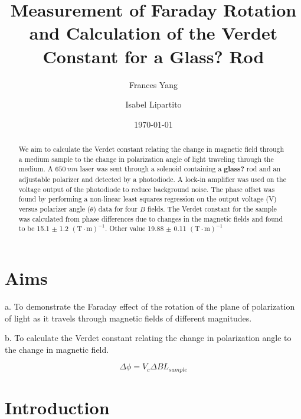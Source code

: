 \documentclass[prb,preprint]{revtex4-1}
\begin{document}
\title{Measurement of Faraday Rotation and Calculation of the Verdet Constant for a Glass? Rod}

\author{Frances Yang}

\author{Isabel Lipartito}

\date{\today}

\begin{abstract}
{We aim to calculate the Verdet constant relating the change in magnetic field through a medium sample to the change in polarization angle of light traveling through the medium.  A $650\ nm$ laser was sent through a solenoid containing a {\bf glass?} rod and an adjustable polarizer and detected by a photodiode. A lock-in amplifier was used on the voltage output of the photodiode to reduce background noise. The phase offset was found by performing a non-linear least squares regression on the output voltage (V) versus polarizer angle ($\theta$) data for four $B$ fields. The Verdet constant for the sample was calculated from phase differences due to changes in the magnetic fields and found to be 15.1 $\pm$ 1.2 $(\text{T}\cdot \text{m})^{-1}$. Other value  19.88 $\pm$ 0.11 $(\text{T}\cdot \text{m})^{-1}$}
\end{abstract}

\maketitle 
\section{Aims}
{a.  To demonstrate the Faraday effect of the rotation of the plane of polarization of light as it travels through magnetic fields of different magnitudes.

b.  To calculate the Verdet constant relating the change in polarization angle to the change in magnetic field.}
\begin{equation}
\Delta \phi =V_{c} \Delta B L{_{sample}}
\end{equation}

\section{Introduction} 
\end{document}
